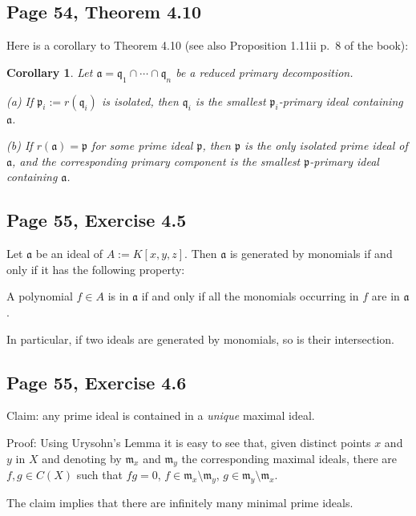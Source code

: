 \documentclass[parskip=half,fontsize=12pt]{scrartcl}%
\newcommand{\mf}{\mathfrak}
\newcommand{\aaa}{\mf a}
\newcommand{\mmm}{\mf m}
\newcommand{\ppp}{\mf p}
\newcommand{\qqq}{\mf q}
\newtheorem{cor}[thm]{Corollary}
\begin{document}
\subsection{Page 54, Theorem 4.10}%

Here is a corollary to Theorem 4.10 (see also Proposition 1.11ii p.~8 of the book):

\begin{cor}\label{410}
Let $\aaa=\qqq_1\cap\cdots\cap\qqq_n$ be a reduced primary decomposition.

(a) If $\ppp_i:=r(\qqq_i)$ is isolated, then $\qqq_i$ is the smallest $\ppp_i$-primary ideal containing $\aaa$.%

(b) If $r(\aaa)=\ppp$ for some prime ideal $\ppp$, then $\ppp$ is the only isolated prime ideal of $\aaa$, and the corresponding primary component is the smallest $\ppp$-primary ideal containing $\aaa$.
\end{cor}

\subsection{Page 55, Exercise 4.5}%

Let $\aaa$ be an ideal of $A:=K[x,y,z]$. Then $\aaa$ is generated by monomials if and only if it has the following property:

A polynomial $f\in A$ is in $\aaa$ if and only if all the monomials occurring in $f$ are in $\aaa$.

In particular, if two ideals are generated by monomials, so is their intersection.

\subsection{Page 55, Exercise 4.6}%

Claim: any prime ideal is contained in a \emph{unique} maximal ideal.

Proof: Using Urysohn's Lemma it is easy to see that, given distinct points $x$ and $y$ in $X$ and denoting by $\mmm_x$ and $\mmm_y$ the corresponding maximal ideals, there are $f,g\in C(X)$ such that $fg=0$, $f\in\mmm_x\setminus\mmm_y$, $g\in\mmm_y\setminus\mmm_x$. 

The claim implies that there are infinitely many minimal prime ideals.

\end{document}
